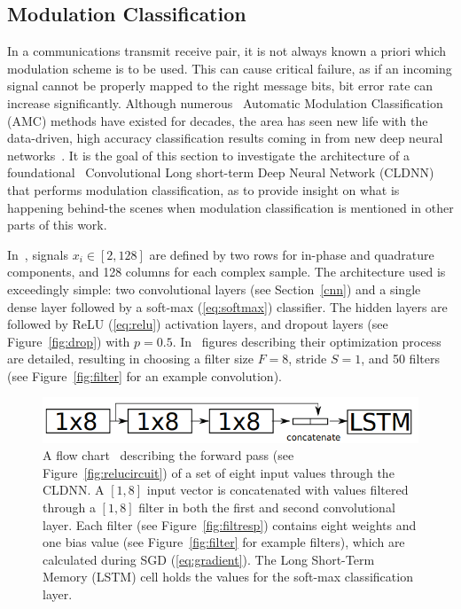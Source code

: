 \subsection{Modulation Classification}
In a communications transmit receive pair, it is not always known a priori which modulation scheme is to be used. This can cause critical failure, as if an incoming signal cannot be properly mapped to the right message bits, bit error rate can increase significantly. Although numerous~\cite{modclassback} Automatic Modulation Classification (AMC) methods have existed for decades, the area has seen new life with the data-driven, high accuracy classification results coming in from new deep neural networks~\cite{modclassback}. It is the goal of this section to investigate the architecture of a foundational~\cite{modclassback} Convolutional Long short-term Deep Neural Network (CLDNN) that performs modulation classification, as to provide insight on what is happening behind-the scenes when modulation classification is mentioned in other parts of this work.

In~\cite{modclassback}, signals $x_i \in [2, 128]$ are defined by two rows for in-phase and quadrature components, and 128 columns for each complex sample. The architecture used is exceedingly simple: two convolutional layers (see Section~\ref{cnn}) and a single dense layer followed by a soft-max (\ref{eq:softmax}) classifier. The hidden layers are followed by ReLU (\ref{eq:relu}) activation layers, and dropout layers (see Figure~\ref{fig:drop}) with $p=0.5$. In~\cite{modclassback} figures describing their optimization process are detailed, resulting in choosing a filter size $F=8$, stride $S=1$, and 50 filters (see Figure~\ref{fig:filter} for an example convolution).

\begin{figure}[ht!]
	\centering	\includegraphics[width=1\textwidth,keepaspectratio]{figs/cldnn.png}
    \caption{A flow chart~\cite{modclassback} describing the forward pass (see Figure~\ref{fig:relucircuit}) of a set of eight input values through the CLDNN. A $[1,8]$ input vector is concatenated with values filtered through a $[1,8]$ filter in both the first and second convolutional layer. Each filter (see Figure~\ref{fig:filtresp}) contains eight weights and one bias value (see Figure~\ref{fig:filter} for example filters), which are calculated during SGD (\ref{eq:gradient}). The Long Short-Term Memory (LSTM) cell holds the values for the soft-max classification layer.}
\label{fig:cldnn}      
\end{figure}

